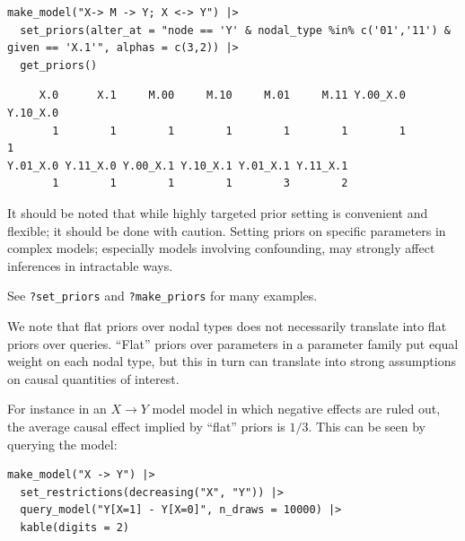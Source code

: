 \documentclass[
  article]{jss}
\begin{document}
\begin{verbatim}
make_model("X-> M -> Y; X <-> Y") |>
  set_priors(alter_at = "node == 'Y' & nodal_type %in% c('01','11') & given == 'X.1'", alphas = c(3,2)) |>
  get_priors()
\end{verbatim}

\begin{verbatim}
     X.0      X.1     M.00     M.10     M.01     M.11 Y.00_X.0 Y.10_X.0 
       1        1        1        1        1        1        1        1 
Y.01_X.0 Y.11_X.0 Y.00_X.1 Y.10_X.1 Y.01_X.1 Y.11_X.1 
       1        1        1        1        3        2 
\end{verbatim}

It should be noted that while highly targeted prior setting is
convenient and flexible; it should be done with caution. Setting priors
on specific parameters in complex models; especially models involving
confounding, may strongly affect inferences in intractable ways.

See \texttt{?set\_priors} and \texttt{?make\_priors} for many examples.

We note that flat priors over nodal types does not necessarily translate
into flat priors over queries. ``Flat'' priors over parameters in a
parameter family put equal weight on each nodal type, but this in turn
can translate into strong assumptions on causal quantities of interest.

For instance in an \(X \rightarrow Y\) model model in which negative
effects are ruled out, the average causal effect implied by ``flat''
priors is \(1/3\). This can be seen by querying the model:

\begin{verbatim}
make_model("X -> Y") |>
  set_restrictions(decreasing("X", "Y")) |>
  query_model("Y[X=1] - Y[X=0]", n_draws = 10000) |>
  kable(digits = 2)
\end{verbatim}
\end{document}
